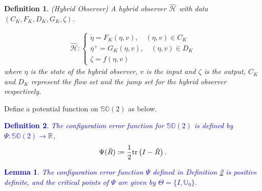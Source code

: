 \documentclass{article}
\newcommand{\SOtwo}{\mathbb{SO}(2)}
\newcommand{\R}[1]{\mathbb{R}^{#1}}
\newtheorem{definition}{Definition}
\newtheorem{lemma}{Lemma}
\newcommand{\trace}[1]{\text{tr}\left(#1\right)}
\newcommand{\textblue}[1]{\textcolor{blue}{#1}}
\begin{document}
\begin{definition}(Hybrid Observer)
    A hybrid observer $\hat{\mathcal{H}}$ with data $(C_K, F_K, D_K, G_K, \zeta)$.

\begin{align}
    \hat{\mathcal{H}} :  \begin{cases}
        \dot{\eta} = F_K(\eta, v), \quad (\eta, v) \in C_K\\
        \eta^+ = G_K(\eta, v), \quad (\eta, v)\in D_K\\
        \zeta = f(\eta, v)
    \end{cases}
\end{align}
where $\eta$ is the state of the hybrid observer, $v$ is the input and $\zeta$ is the output, $C_K$ and $D_K$ represent the flow set and the jump set for the hybrid observer respectively. 
\end{definition}


Define a potential function on $\SOtwo$ as below. 

\textblue{
\begin{definition}\label{def:config_err}
    The configuration error function for $\SOtwo$ is defined by $\Psi: \SOtwo \to \R{}$, \[\Psi({\Tilde{R}}) \coloneqq \frac{1}{2}\trace{I - \Tilde{R}}.\]
\end{definition}}
\textblue{
\begin{lemma} 
    The configuration error function $\Psi$ defined in Definition \ref{def:config_err} is positive definite, and the critical points of $\Psi$ are given by $\Theta =  \{I, \mathbb{U}_0\}$.
\end{lemma}
}
\end{document}

